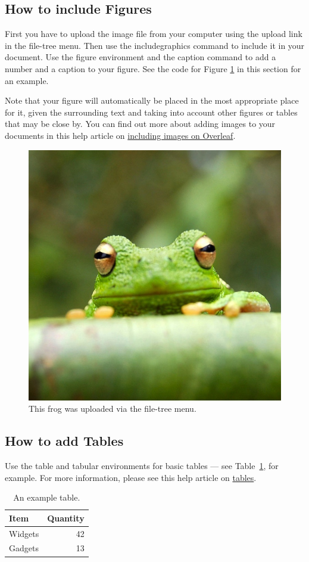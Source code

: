 \documentclass[dvipdfmx,twocolumn]{jsarticle}
\begin{document}
      \subsection{How to include Figures}

            First you have to upload the image file from your computer using the upload link in the file-tree menu. Then use the includegraphics command to include it in your document. Use the figure environment and the caption command to add a number and a caption to your figure. See the code for Figure \ref{fig:frog} in this section for an example.

            Note that your figure will automatically be placed in the most appropriate place for it, given the surrounding text and taking into account other figures or tables that may be close by. You can find out more about adding images to your documents in this help article on \href{https://www.overleaf.com/learn/how-to/Including_images_on_Overleaf}{including images on Overleaf}.

            \begin{figure}
                  \centering
                  \includegraphics[width=0.25\linewidth]{frog.jpg}
                  \caption{\label{fig:frog}This frog was uploaded via the file-tree menu.}
            \end{figure}

      \subsection{How to add Tables}

            Use the table and tabular environments for basic tables --- see Table~\ref{tab:widgets}, for example. For more information, please see this help article on \href{https://www.overleaf.com/learn/latex/tables}{tables}.

            \begin{table}
                  \centering
                  \begin{tabular}{l|r}
                        Item    & Quantity \\\hline
                        Widgets & 42       \\
                        Gadgets & 13
                  \end{tabular}
                  \caption{\label{tab:widgets}An example table.}
            \end{table}
\end{document}
